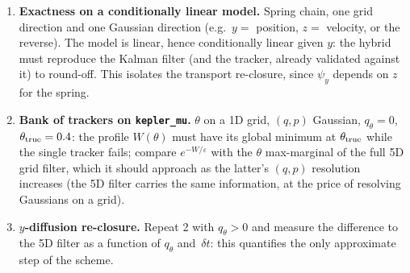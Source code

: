 \documentclass[11pt,a4paper]{article}
\newcommand{\eps}{\varepsilon}
\newcommand{\dt}{\,\delta t}
\theoremstyle{plain}
\theoremstyle{definition}
\theoremstyle{remark}
\begin{document}
\begin{enumerate}[leftmargin=1.5em]
  \item \textbf{Exactness on a conditionally linear model.} Spring chain, one grid direction and one Gaussian direction (e.g.\ $y=$ position, $z=$ velocity, or the reverse). The model is linear, hence conditionally linear given $y$: the hybrid must reproduce the Kalman filter (and the tracker, already validated against it) to round-off. This isolates the transport re-closure, since $\psi_y$ depends on $z$ for the spring.
  \item \textbf{Bank of trackers on \texttt{kepler\_mu}.} $\theta$ on a 1D grid, $(q,p)$ Gaussian, $q_\theta=0$, $\theta_{\rm true}=0.4$: the profile $W(\theta)$ must have its global minimum at $\theta_{\rm true}$ while the single tracker fails; compare $e^{-W/\eps}$ with the $\theta$ max-marginal of the full 5D grid filter, which it should approach as the latter's $(q,p)$ resolution increases (the 5D filter carries the same information, at the price of resolving Gaussians on a grid).
  \item \textbf{$y$-diffusion re-closure.} Repeat 2 with $q_\theta>0$ and measure the difference to the 5D filter as a function of $q_\theta$ and $\dt$: this quantifies the only approximate step of the scheme.
\end{enumerate}
\end{document}
